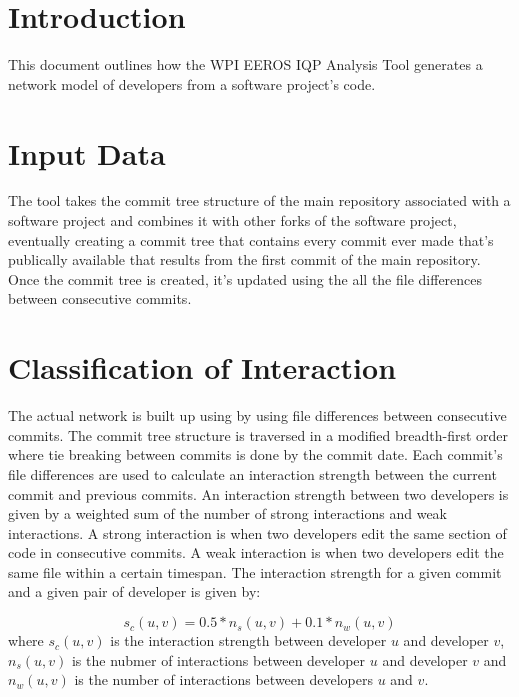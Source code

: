 \documentclass[12pt]{article}
\begin{document}
\maketitle

\section{Introduction}

This document outlines how the WPI EEROS IQP Analysis Tool generates a network model of developers from a software project's code.

\section{Input Data}

The tool takes the commit tree structure of the main repository associated with a software project and combines it with other forks of the software project, eventually creating a commit tree that contains every commit ever made that's publically available that results from the first commit of the main repository.  
Once the commit tree is created, it's updated using the all the file differences between consecutive commits.


\section{Classification of Interaction}

The actual network is built up using by using file differences between consecutive commits. The commit tree structure is traversed in a modified breadth-first order where tie breaking between commits is done by the commit date.  Each commit's file differences are used to calculate an interaction strength between the current commit and previous commits.  An interaction strength between two developers is given by a weighted sum of the number of strong interactions and weak interactions.  A strong interaction is when two developers edit the same section of code in consecutive commits.  A weak interaction is when two developers edit the same file within a certain timespan.  The interaction strength for a given commit and a given pair of developer is given by:

$$ s_c(u, v) = 0.5 * n_s(u, v) + 0.1 * n_w(u, v) $$
where $ s_c(u, v)$ is the interaction strength between developer $u$ and developer $v$, $n_s(u,v)$ is the nubmer of interactions between developer $u$ and developer $v$ and $n_w(u,v)$ is the number of interactions between developers $u$ and $v$.  
\end{document}
